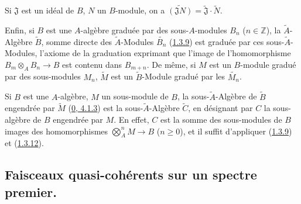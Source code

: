 \begin{env}[1.3.13]
Si $\mathfrak{J}$ est un idéal de $B$, $N$ un $B$-module, on a
$\widetilde{(\mathfrak{J}N)}=\widetilde{\mathfrak{J}}\cdot\widetilde{N}$.

Enfin, si $B$ est une $A$-algèbre graduée par des sous-$A$-modules $B_n$
($n\in\mathbb{Z}$), la $\widetilde{A}$-Algèbre $\widetilde{B}$, somme directe
des $\widetilde{A}$-Modules $\widetilde{B_n}$
(\hyperref[I.1.3.9-fr]{1.3.9}) est graduée par ces sous-$\widetilde{A}$-Modules,
l'axiome de la graduation exprimant que l'image de l'homomorphisme
$B_m\otimes_A B_n\to B$ est contenu dans $B_{m+n}$. De même, si $M$ est un
$B$-module gradué par des sous-modules $M_n$, $\widetilde{M}$ est un
$\widetilde{B}$-Module gradué par les $\widetilde{M_n}$.
\end{env}

\begin{env}[1.3.14]
\label{I.1.3.14-fr}
Si $B$ est une $A$-algèbre, $M$ un sous-module de $B$, la
sous-$\widetilde{A}$-Algèbre de $\widetilde{B}$ engendrée par $\widetilde{M}$
(\hyperref[0.4.1.3-fr]{0, 4.1.3}) est la sous-$\widetilde{A}$-Algèbre
$\widetilde{C}$, en désignant par $C$ la sous-algèbre de $B$ engendrée par
$M$. En effet, $C$ est la somme des sous-modules de $B$ images des
homomorphismes $\bigotimes_A^n M\to B$ ($n\geq0$), et il suffit d'appliquer
(\hyperref[I.1.3.9-fr]{1.3.9}) et (\hyperref[I.1.3.12-fr]{1.3.12}).
\end{env}

\subsection{Faisceaux quasi-cohérents sur un spectre premier.}
\label{subsection:I.1.4-fr}

